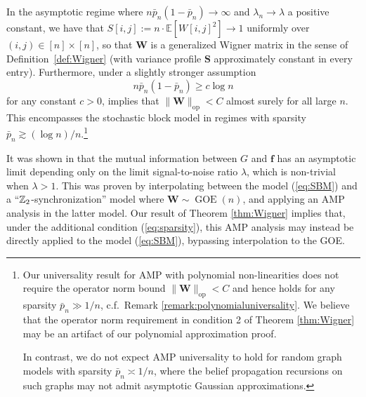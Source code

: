 \documentclass[10pt,reqno]{amsart}
\def\f{\mathbf{f}}
\def\W{\mathbf{W}}
\def\S{\mathbf{S}}
\def\E{\mathbb{E}}
\def\op{\mathrm{op}}
\def\GOE{\operatorname{GOE}}
\begin{document}
\begin{example}
In the asymptotic regime where $n\bar{p}_n(1-\bar{p}_n) \to \infty$ and
$\lambda_n \to \lambda$ a positive constant, we have that
$S[i,j]:=n \cdot \E[W[i,j]^2] \to 1$ uniformly over $(i,j) \in [n] \times [n]$, 
so that $\W$ is a generalized Wigner matrix in the sense of 
Definition~\ref{def:Wigner} (with variance profile $\S$ approximately constant 
in every entry).
Furthermore, under a slightly stronger assumption
\begin{equation}\label{eq:sparsity}
n\bar{p}_n(1-\bar{p}_n) \geq c\log n
\end{equation}
for any constant $c>0$, \cite[Theorem 2.7 and Eq.\ (2.4)]{benaych2020spectral}
implies that $\|\W\|_{\op}<C$ almost surely for all large
$n$. This encompasses the stochastic block model in regimes with sparsity
$\bar{p}_n \gtrsim (\log n)/n$.\footnote{Our universality result for AMP
with polynomial non-linearities does not require the operator norm bound
$\|\W\|_{\op}<C$ and hence holds for any sparsity $\bar{p}_n \gg 1/n$, c.f.\
Remark \ref{remark:polynomialuniversality}. We
believe that the operator norm requirement in condition 2 of Theorem
\ref{thm:Wigner} may be an artifact of our
polynomial approximation proof.

In contrast, we do not expect AMP universality
to hold for random graph models with sparsity $\bar{p}_n \asymp 1/n$, where
the belief propagation recursions on such graphs may not admit asymptotic
Gaussian approximations.}

It was shown in \cite{deshpande2017asymptotic} that the mutual information 
between $G$ and $\f$ has an asymptotic limit depending only on the limit
signal-to-noise ratio $\lambda$, which is non-trivial when $\lambda>1$.
This was proven by interpolating between the model (\ref{eq:SBM}) and a
``$\mathbb{Z}_2$-synchronization'' model where $\W \sim \GOE(n)$, and applying
an AMP analysis in the latter model. Our result of
Theorem \ref{thm:Wigner} implies that, under the additional condition
(\ref{eq:sparsity}), this AMP analysis may instead be directly applied to the
model (\ref{eq:SBM}), bypassing interpolation to the GOE.
\end{example}
\end{document}
